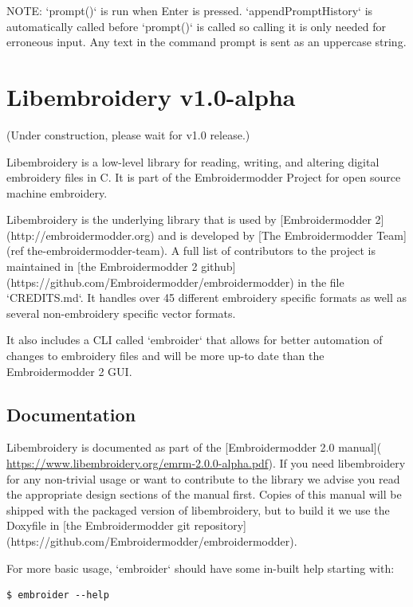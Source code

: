 \documentclass[a4paper]{report}
\begin{document}
NOTE: `prompt()` is run when Enter is pressed.
`appendPromptHistory` is automatically called before `prompt()`
is called so calling it is only needed for erroneous input.
Any text in the command prompt is sent as an uppercase string.

\chapter{Libembroidery v1.0-alpha}

(Under construction, please wait for v1.0 release.)

Libembroidery is a low-level library for reading, writing, 
and altering digital embroidery files in C. It is part of the Embroidermodder Project
for open source machine embroidery.

Libembroidery is the underlying library that is used by [Embroidermodder 2](http://embroidermodder.org)
and is developed by [The Embroidermodder Team](ref the-embroidermodder-team).
A full list of contributors to the project is maintained in
[the Embroidermodder 2 github](https://github.com/Embroidermodder/embroidermodder)
in the file `CREDITS.md`.
It handles over 45 different embroidery specific formats as well
as several non-embroidery specific vector formats.

It also includes a CLI called `embroider` that allows for better automation of
changes to embroidery files and will be more up-to date than
the Embroidermodder 2 GUI.

\section{Documentation}

Libembroidery is documented as part of the [Embroidermodder 2.0 manual](
\url{https://www.libembroidery.org/emrm-2.0.0-alpha.pdf}).
If you need libembroidery for any non-trivial usage or want to contribute to
the library we advise you read the appropriate design sections of the manual
first. Copies of this manual will be shipped with the packaged version of
libembroidery, but to build it we use the Doxyfile in [the Embroidermodder git
repository](https://github.com/Embroidermodder/embroidermodder).

For more basic usage, `embroider` should have some in-built help starting with:

\begin{lstlisting}
$ embroider --help
\end{lstlisting}
\end{document}
